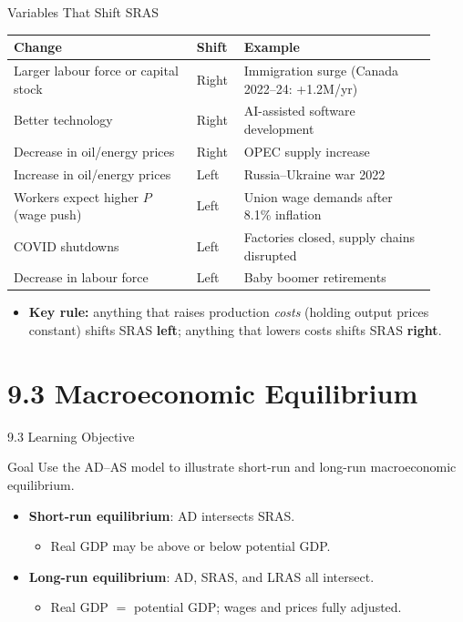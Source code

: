 \documentclass[aspectratio=169]{beamer}
\begin{document}
\begin{frame}{Variables That Shift SRAS}
\transfade
\begin{center}
\small
\begin{tabular}{p{0.40\linewidth} p{0.10\linewidth} p{0.42\linewidth}}
\toprule
\textbf{Change} & \textbf{Shift} & \textbf{Example} \\
\midrule
Larger labour force or capital stock & Right & Immigration surge (Canada 2022--24: +1.2M/yr) \\
Better technology & Right & AI-assisted software development \\
Decrease in oil/energy prices & Right & OPEC supply increase \\
Increase in oil/energy prices & Left & Russia--Ukraine war 2022 \\
Workers expect higher $P$ (wage push) & Left & Union wage demands after 8.1\% inflation \\
COVID shutdowns & Left & Factories closed, supply chains disrupted \\
Decrease in labour force & Left & Baby boomer retirements \\
\bottomrule
\end{tabular}
\end{center}
\vspace{0.3em}
\begin{itemize}[<+->]
  \item \textbf{Key rule:} anything that raises production \textit{costs} (holding output prices constant) shifts SRAS \textbf{left}; anything that lowers costs shifts SRAS \textbf{right}.
\end{itemize}
\end{frame}

\section{9.3 Macroeconomic Equilibrium}

\begin{frame}{9.3 Learning Objective}
\transfade
\begin{block}{Goal}
Use the AD--AS model to illustrate short-run and long-run macroeconomic equilibrium.
\end{block}
\begin{itemize}[<+->]
  \item \textbf{Short-run equilibrium}: AD intersects SRAS.
  \begin{itemize}[<+->]
    \item Real GDP may be above or below potential GDP.
  \end{itemize}
  \item \textbf{Long-run equilibrium}: AD, SRAS, and LRAS all intersect.
  \begin{itemize}[<+->]
    \item Real GDP $=$ potential GDP; wages and prices fully adjusted.
  \end{itemize}
\end{itemize}
\end{frame}
\end{document}
